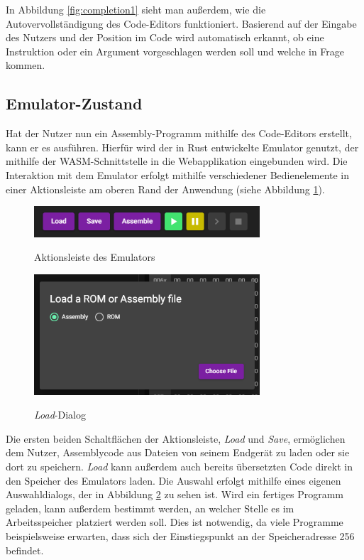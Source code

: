 In Abbildung \ref{fig:completion1} sieht man außerdem, wie die Autovervollständigung des Code-Editors funktioniert. Basierend auf der Eingabe des Nutzers und der Position im Code wird automatisch erkannt, ob eine Instruktion oder ein Argument vorgeschlagen werden soll und welche in Frage kommen.

\subsection{Emulator-Zustand}

Hat der Nutzer nun ein Assembly-Programm mithilfe des Code-Editors erstellt, kann er es ausführen. Hierfür wird der in Rust entwickelte Emulator genutzt, der mithilfe der \ac{WASM}-Schnittstelle in die Webapplikation eingebunden wird. Die Interaktion mit dem Emulator erfolgt mithilfe verschiedener Bedienelemente in einer Aktionsleiste am oberen Rand der Anwendung (siehe Abbildung \ref{fig:actionbar}).

\begin{figure}[h]
    \caption{Aktionsleiste des Emulators}
    \centering
    \includegraphics[width=0.75\textwidth]{Bilder/Aktionsleiste.png}
    \label{fig:actionbar}
\end{figure}

\begin{figure}
    \caption{\textit{Load}-Dialog}
    \centering
    \includegraphics[width=0.75\textwidth]{Bilder/LoadDialog.png}
    \label{fig:loaddialog}
\end{figure}

Die ersten beiden Schaltflächen der Aktionsleiste, \textit{Load} und \textit{Save}, ermöglichen dem Nutzer, Assemblycode aus Dateien von seinem Endgerät zu laden oder sie dort zu speichern. \textit{Load} kann außerdem auch bereits übersetzten Code direkt in den Speicher des Emulators laden. Die Auswahl erfolgt mithilfe eines eigenen Auswahldialogs, der in Abbildung \ref{fig:loaddialog} zu sehen ist. Wird ein fertiges Programm geladen, kann außerdem bestimmt werden, an welcher Stelle es im Arbeitsspeicher platziert werden soll. Dies ist notwendig, da viele Programme beispielsweise erwarten, dass sich der Einstiegspunkt an der Speicheradresse 256 befindet.

